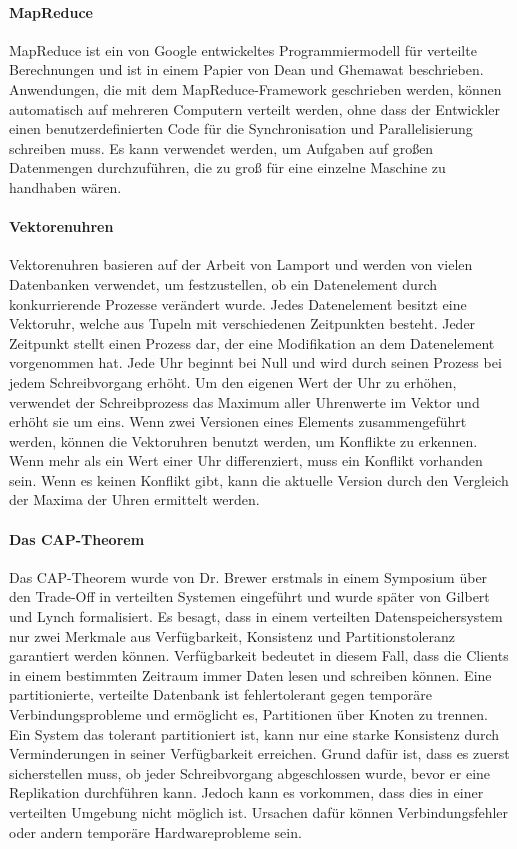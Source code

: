 \paragraph{MapReduce} MapReduce ist ein von Google entwickeltes Programmiermodell für verteilte Berechnungen und ist in einem Papier von Dean und Ghemawat \cite{Dean:2008:MSD:1327452.1327492} beschrieben. Anwendungen, die mit dem MapReduce-Framework geschrieben werden, können automatisch auf mehreren Computern verteilt werden, ohne dass der Entwickler einen benutzerdefinierten Code für die Synchronisation und Parallelisierung schreiben muss. Es kann verwendet werden, um Aufgaben auf großen Datenmengen durchzuführen, die zu groß für eine einzelne Maschine zu handhaben wären.

\paragraph{Vektorenuhren }
Vektorenuhren  basieren auf der Arbeit von Lamport \cite{Lamport:1978:TCO:359545.359563} und werden von vielen Datenbanken verwendet, um festzustellen, ob ein Datenelement durch konkurrierende Prozesse verändert wurde. Jedes Datenelement besitzt eine Vektoruhr, welche aus Tupeln mit verschiedenen Zeitpunkten besteht. Jeder Zeitpunkt stellt einen Prozess dar, der eine Modifikation an dem Datenelement vorgenommen hat. Jede Uhr beginnt bei Null und wird durch seinen Prozess bei jedem Schreibvorgang erhöht. Um den eigenen Wert der Uhr zu erhöhen, verwendet der Schreibprozess das Maximum aller Uhrenwerte im Vektor und erhöht sie um eins. Wenn zwei Versionen eines Elements zusammengeführt werden, können die Vektoruhren benutzt werden, um Konflikte zu erkennen. Wenn mehr als ein Wert einer Uhr differenziert, muss ein Konflikt vorhanden sein. Wenn es keinen Konflikt gibt, kann die aktuelle Version durch den Vergleich der Maxima der Uhren ermittelt werden.

\paragraph{Das CAP-Theorem} Das CAP-Theorem wurde von Dr. Brewer erstmals in einem Symposium \cite{cap2010} über den Trade-Off in verteilten Systemen eingeführt und wurde später von Gilbert und Lynch \cite{Gilbert:2002:BCF:564585.564601} formalisiert. Es besagt, dass in einem verteilten Datenspeichersystem nur zwei Merkmale aus Verfügbarkeit, Konsistenz und  Partitionstoleranz garantiert werden können. Verfügbarkeit bedeutet in diesem Fall, dass die Clients in einem bestimmten Zeitraum immer Daten lesen und schreiben können. Eine partitionierte, verteilte Datenbank ist fehlertolerant gegen temporäre Verbindungsprobleme und ermöglicht es, Partitionen über Knoten zu trennen. Ein System das tolerant partitioniert ist, kann nur eine starke Konsistenz durch Verminderungen in seiner Verfügbarkeit erreichen. Grund dafür ist, dass es zuerst sicherstellen muss, ob jeder Schreibvorgang abgeschlossen wurde, bevor er eine Replikation durchführen kann. Jedoch kann es vorkommen, dass dies in einer verteilten Umgebung nicht möglich ist. Ursachen dafür können Verbindungsfehler oder andern temporäre Hardwareprobleme sein.

